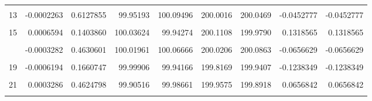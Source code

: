 \documentclass[a4paper]{tufte-handout}
\begin{document}
\begin{table}
{\begin{tabular}[t]{rrrrrrrrr}
\addlinespace
\cellcolor{gray!6}{12} & \cellcolor{gray!6}{-0.0006464} & \cellcolor{gray!6}{0.1483490} & \cellcolor{gray!6}{99.99653} & \cellcolor{gray!6}{99.94682} & \cellcolor{gray!6}{199.8141} & \cellcolor{gray!6}{199.9433} & \cellcolor{gray!6}{-0.1292428} & \cellcolor{gray!6}{-0.1292428}\\
13 & -0.0002263 & 0.6127855 & 99.95193 & 100.09496 & 200.0016 & 200.0469 & -0.0452777 & -0.0452777\\
\cellcolor{gray!6}{14} & \cellcolor{gray!6}{0.0001560} & \cellcolor{gray!6}{0.7272108} & \cellcolor{gray!6}{100.13666} & \cellcolor{gray!6}{99.89418} & \cellcolor{gray!6}{200.0620} & \cellcolor{gray!6}{200.0308} & \cellcolor{gray!6}{0.0312058} & \cellcolor{gray!6}{0.0312058}\\
15 & 0.0006594 & 0.1403860 & 100.03624 & 99.94274 & 200.1108 & 199.9790 & 0.1318565 & 0.1318565\\
\cellcolor{gray!6}{16} & \cellcolor{gray!6}{0.0004778} & \cellcolor{gray!6}{0.2853648} & \cellcolor{gray!6}{99.92304} & \cellcolor{gray!6}{100.07177} & \cellcolor{gray!6}{200.0904} & \cellcolor{gray!6}{199.9948} & \cellcolor{gray!6}{0.0955532} & \cellcolor{gray!6}{0.0955532}\\
\addlinespace
17 & -0.0003282 & 0.4630601 & 100.01961 & 100.06666 & 200.0206 & 200.0863 & -0.0656629 & -0.0656629\\
\cellcolor{gray!6}{18} & \cellcolor{gray!6}{-0.0001478} & \cellcolor{gray!6}{0.7410526} & \cellcolor{gray!6}{99.96112} & \cellcolor{gray!6}{100.17508} & \cellcolor{gray!6}{200.1066} & \cellcolor{gray!6}{200.1362} & \cellcolor{gray!6}{-0.0295773} & \cellcolor{gray!6}{-0.0295773}\\
19 & -0.0006194 & 0.1660747 & 99.99906 & 99.94166 & 199.8169 & 199.9407 & -0.1238349 & -0.1238349\\
\cellcolor{gray!6}{20} & \cellcolor{gray!6}{-0.0006640} & \cellcolor{gray!6}{0.1376396} & \cellcolor{gray!6}{99.97401} & \cellcolor{gray!6}{100.05617} & \cellcolor{gray!6}{199.8974} & \cellcolor{gray!6}{200.0302} & \cellcolor{gray!6}{-0.1328101} & \cellcolor{gray!6}{-0.1328101}\\
21 & 0.0003286 & 0.4624798 & 99.90516 & 99.98661 & 199.9575 & 199.8918 & 0.0656842 & 0.0656842\\
\addlinespace
\cellcolor{gray!6}{22} & \cellcolor{gray!6}{0.0003411} & \cellcolor{gray!6}{0.4455869} & \cellcolor{gray!6}{100.03523} & \cellcolor{gray!6}{99.96079} & \cellcolor{gray!6}{200.0642} & \cellcolor{gray!6}{199.9960} & \cellcolor{gray!6}{0.0682249} & \cellcolor{gray!6}{0.0682249}\\

\end{tabular}}
\end{table}
\end{document}
